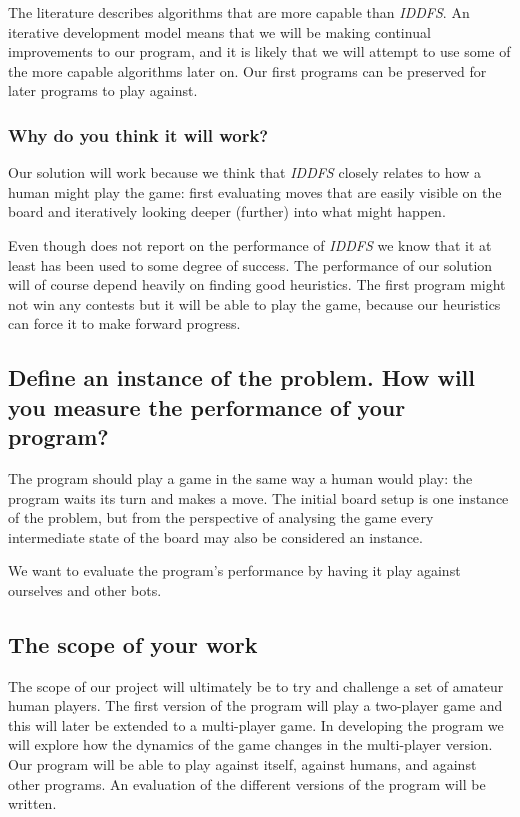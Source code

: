 \documentclass[a4paper,11pt]{article}
\begin{document}
The literature describes algorithms that are more capable than
\emph{IDDFS}. An iterative development model means that we will be
making continual improvements to our program, and it is likely that we
will attempt to use some of the more capable algorithms later on. Our
first programs can be preserved for later programs to play against.

\subsubsection{Why do you think it will work?}

Our solution will work because we think that \emph{IDDFS} closely
relates to how a human might play the game: first evaluating moves
that are easily visible on the board and iteratively looking deeper
(further) into what might happen.

Even though \cite{Huang:2001:SGP:378593.378708} does not report on the
performance of \emph{IDDFS} we know that it at least has been used to
some degree of success. The performance of our solution will of course
depend heavily on finding good heuristics. The first program might not
win any contests but it will be able to play the game, because our
heuristics can force it to make forward progress.

\subsection{Define an instance of the problem. How will you measure the performance of your program?}

The program should play a game in the same way a human would play: the
program waits its turn and makes a move. The initial board setup is
one instance of the problem, but from the perspective of analysing the
game every intermediate state of the board may also be considered an
instance.

We want to evaluate the program's performance by having it play
against ourselves and other bots.


\subsection{The scope of your work}

The scope of our project will ultimately be to try and challenge a set
of amateur human players. The first version of the program will play a
two-player game and this will later be extended to a multi-player
game. In developing the program we will explore how the dynamics of
the game changes in the multi-player version. Our program will be able
to play against itself, against humans, and against other programs. An
evaluation of the different versions of the program will be written.
\end{document}
